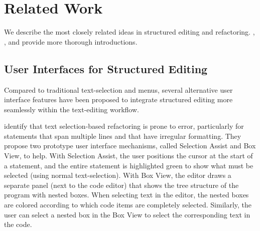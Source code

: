 \section{Related Work}
\label{sec:discussion-related}

We describe the most closely related ideas in structured
editing and refactoring.
\citet{Barista}, \citet{DNDRefactoring}, and \citet{HazelnutSNAPL}
provide more thorough introductions.


\subsection{User Interfaces for Structured Editing}


Compared to traditional text-selection and menus, several alternative user
interface features have been proposed to integrate structured editing more
seamlessly within the text-editing workflow.




\citet{Murphy-Hill-ICSE2008} identify that text selection-based refactoring is
prone to error, particularly for statements that span multiple lines and that
have irregular formatting.
They propose two prototype user interface mechanisms, called
Selection Assist and Box View, to help.
With Selection Assist, the user positions the cursor at the start of a statement, and
the entire statement is highlighted green to show what must be
selected (using normal text-selection).
With Box View, the editor draws a separate panel (next to the code editor) that
shows the tree structure of the program with nested boxes. When selecting text
in the editor, the nested boxes are colored according to which code items are
completely selected. Similarly, the user can select a nested box in the Box View
to select the corresponding text in the code.

